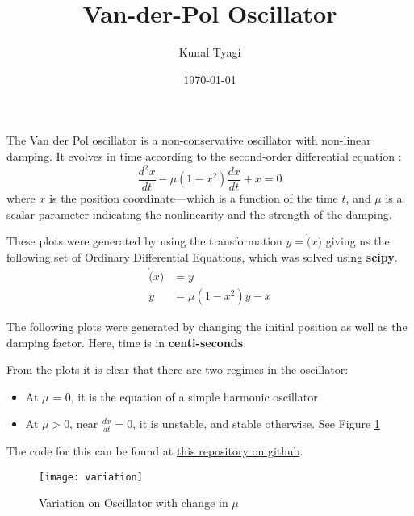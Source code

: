 \documentclass[12pt, a4paper]{article}
\title{Van-der-Pol Oscillator}
\author{Kunal Tyagi}
\date{\today}
\begin{document}
\maketitle
The Van der Pol oscillator is a non-conservative oscillator with
non-linear damping.  It evolves in time according to the second-order
differential equation \cite{wiki, slides}:
\begin{equation}
    \frac{d^2x}{dt} - \mu (1 - x^2)\frac{dx}{dt} + x = 0
\end{equation}
where $x$ is the position coordinate—which is a function of the time $t$, and
$\mu$ is a scalar parameter indicating the nonlinearity and the strength of
the damping.

These plots were generated by using the transformation $y = \dot(x)$
giving us the following set of Ordinary Differential Equations, which
was solved using \textbf{scipy}.
\begin{align}
    \dot(x) &= y\\
    \dot{y} &= \mu(1- x^2)y - x
\end{align}

The following plots were generated by changing the initial position as
well as the damping factor. Here, time is in \textbf{centi-seconds}.



From the plots it is clear that there are two regimes in the oscillator:
\begin{itemize}
        \item At $\mu$ = 0, it is the equation of a simple harmonic
            oscillator
        \item At $\mu > $0, near $\frac{dx}{dt} = 0$, it is unstable, and
            stable otherwise. See Figure \ref{fig:variation}
\end{itemize}

The code for this can be found at
\href{https://github.com/kunaltyagi/sdes-project-1}{this repository on
github}.
\begin{figure}[ht]
    \centering
    \texttt{[image: variation]}
    \caption{Variation on Oscillator with change in $\mu$}
    \label{fig:variation}
\end{figure}

{}
\end{document}
